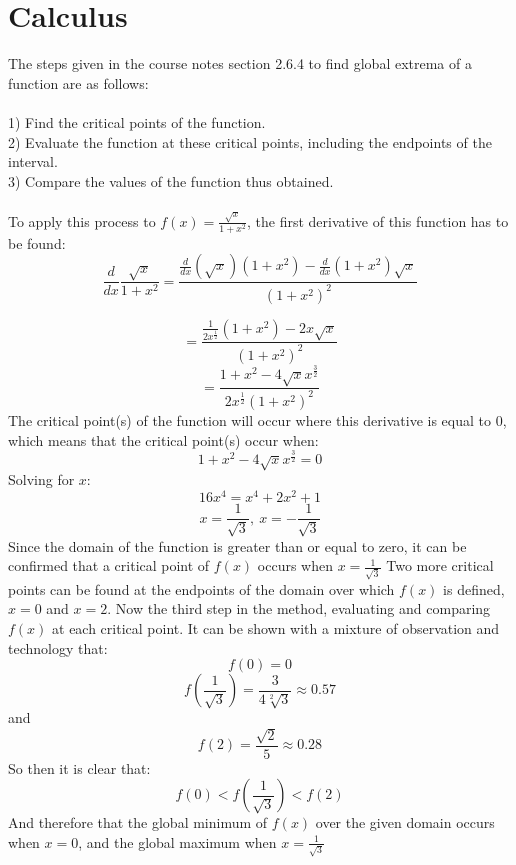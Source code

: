 \documentclass[11pt]{article}
\begin{document}
\section*{Calculus}
The steps given in the course notes section 2.6.4 to find global extrema of a function are as follows:\\\\
1) Find the critical points of the function.\\
2) Evaluate the function at these critical points, including the endpoints of the interval.\\
3) Compare the values of the function thus obtained.\\
\\
To apply this process to $f(x)=\frac{\sqrt{x}}{1+x^2}$, the first derivative of this function has to be found:
$$\frac{d}{dx}\frac{\sqrt{x}}{1+x^2} =\frac{\frac{d}{dx}\left(\sqrt{x}\right)\left(1+x^2\right)-\frac{d}{dx}\left(1+x^2\right)\sqrt{x}}{\left(1+x^2\right)^2}$$

$$=\frac{\frac{1}{2x^{\frac{1}{2}}}\left(1+x^2\right)-2x\sqrt{x}}{\left(1+x^2\right)^2}$$
$$=\frac{1+x^2-4\sqrt{x}x^{\frac{3}{2}}}{2x^{\frac{1}{2}}\left(1+x^2\right)^2}$$
The critical point(s) of the function will occur where this derivative is equal to 0, which means that the critical point(s) occur when:
$$1+x^2-4\sqrt{x}x^{\frac{3}{2}}=0$$
Solving for $x$:
$$16x^4=x^4+2x^2+1$$
$$x=\frac{1}{\sqrt{3}},\:x=-\frac{1}{\sqrt{3}}$$
Since the domain of the function is greater than or equal to zero, it can be confirmed that a critical point of $f(x)$ occurs when $x=\frac{1}{\sqrt{3}}$
Two more critical points can be found at the endpoints of the domain over which $f(x)$ is defined, $x=0$ and $x=2$. Now the third step in the method, evaluating and comparing $f(x)$ at each critical point. It can be shown with a mixture of observation and technology that:
$$f(0)=0$$
$$f(\frac{1}{\sqrt{3}})=\frac{3}{4\sqrt[2]{3}}\approx 0.57$$
and
$$f(2)=\frac{\sqrt{2}}{5}\approx 0.28$$
So then it is clear that:
$$f(0)<f(\frac{1}{\sqrt{3}})<f(2)$$
And therefore that the global minimum of $f(x)$ over the given domain occurs when $x=0$, and the global maximum when $x=\frac{1}{\sqrt{3}}$
\end{document}
